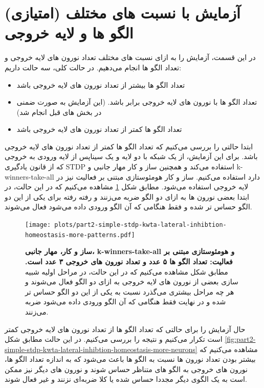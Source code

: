 \clearpage
\section{(امتیازی) آزمایش با نسبت های مختلف الگو ها و لایه خروجی}
    در این قسمت، آزمایش را به ازای نسبت های مختلف تعداد نورون های لایه خروجی و تعداد الگو ها انجام می‌دهیم. در حالت کلی، سه حالت داریم:
    \begin{itemize}
        \item تعداد الگو ها بیشتر از تعداد نورون های لایه خروجی باشد
        \item تعداد الگو ها با نورون های لایه خروجی برابر باشد.
        (این آزمایش به صورت ضمنی در بخش های قبل انجام شد)
        \item تعداد الگو ها کمتر از تعداد نورون های لایه خروجی باشد
    \end{itemize}

    ابتدا حالتی را بررسی می‌کنیم که تعداد الگو ها کمتر از تعداد نورون های لایه خروجی باشد. برای این آزمایش، از یک شبکه با دو لایه و یک سیناپس از لایه ورودی به خروجی که از قانون یادگیری 
    STDP 
    استفاده می‌کند و همچنین ساز و کار مهار جانبی و 
    k-winners-take-all 
    دارد استفاده می‌کنیم. ساز و کار هومئوستازی مبتنی بر فعالیت نیز در لایه خروجی استفاده می‌شود. مطابق شکل 
    \ref{fig:part2-simple-stdp-kwta-lateral-inhibtion-homeostasis-more-patterns} 
    مشاهده می‌کنیم که در این حالت، در ابتدا بعضی نورون ها به ازای دو الگو ضربه می‌زنند و رفته رفته برای یکی از این دو الگو حساس تر شده و فقط هنگامی که آن الگو ورودی داده می‌شود فعال می‌شوند.


    \begin{figure}[!ht]
        \centering
        \texttt{[image: plots/part2-simple-stdp-kwta-lateral-inhibtion-homeostasis-more-patterns.pdf]} 
        \captionsetup{width=.9\linewidth}
        \caption{\textbf{ ساز و کار، مهار جانبی، 
        k-winners-take-all و 
        هومئوستازی مبتنی بر فعالیت: تعداد الگو ها ۵ عدد و تعداد نورون های خروجی ۳ عدد است.} مطابق شکل مشاهده می‌کنیم که در این حالت، در مراحل اولیه شبیه سازی بعضی از نورون های لایه خروجی به ازای دو الگو فعال می‌شوند و هر چه مراحل بیشتری می‌گذرد نسبت به یکی از این دو الگو حساس تر شده و در نهایت فقط هنگامی که آن الگو ورودی داده می‌شود ضربه می‌زنند.}
        \label{fig:part2-simple-stdp-kwta-lateral-inhibtion-homeostasis-more-patterns}
    \end{figure}

    حال آزمایش را برای حالتی که تعداد الگو ها از تعداد نورون های لایه خروجی کمتر است تکرار می‌کنیم و نتیجه را بررسی می‌کنیم. در این حالت مطابق شکل 
    \ref{fig:part2-simple-stdp-kwta-lateral-inhibtion-homeostasis-more-neurons}
    مشاهده می‌کنیم که بیشتر بودن تعداد نورون ها نسبت به الگو ها باعث می‌شود که به اندازه تعداد الگو ها، نورون های خروجی به الگو های متناظر حساس شوند و نورون های دیگر نیز ممکن است به یک الگوی دیگر مجددا حساس شده یا کلا ضربه‌ای نزنند و غیر فعال شوند.

